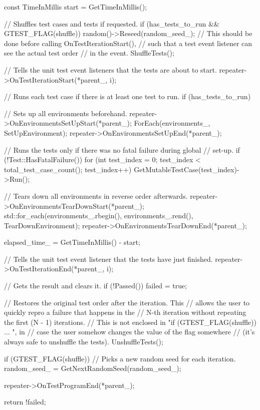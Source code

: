 \begin{DoxyCode}
{{    const TimeInMillis start = GetTimeInMillis();

    // Shuffles test cases and tests if requested.
    if (has_tests_to_run && GTEST_FLAG(shuffle)) {
      random()->Reseed(random_seed_);
      // This should be done before calling OnTestIterationStart(),
      // such that a test event listener can see the actual test order
      // in the event.
      ShuffleTests();
    }

    // Tells the unit test event listeners that the tests are about to start.
    repeater->OnTestIterationStart(*parent_, i);

    // Runs each test case if there is at least one test to run.
    if (has_tests_to_run) {
      // Sets up all environments beforehand.
      repeater->OnEnvironmentsSetUpStart(*parent_);
      ForEach(environments_, SetUpEnvironment);
      repeater->OnEnvironmentsSetUpEnd(*parent_);

      // Runs the tests only if there was no fatal failure during global
      // set-up.
      if (!Test::HasFatalFailure()) {
        for (int test_index = 0; test_index < total_test_case_count();
             test_index++) {
          GetMutableTestCase(test_index)->Run();
        }
      }

      // Tears down all environments in reverse order afterwards.
      repeater->OnEnvironmentsTearDownStart(*parent_);
      std::for_each(environments_.rbegin(), environments_.rend(),
                    TearDownEnvironment);
      repeater->OnEnvironmentsTearDownEnd(*parent_);
    }

    elapsed_time_ = GetTimeInMillis() - start;

    // Tells the unit test event listener that the tests have just finished.
    repeater->OnTestIterationEnd(*parent_, i);

    // Gets the result and clears it.
    if (!Passed()) {
      failed = true;
    }

    // Restores the original test order after the iteration.  This
    // allows the user to quickly repro a failure that happens in the
    // N-th iteration without repeating the first (N - 1) iterations.
    // This is not enclosed in "if (GTEST_FLAG(shuffle)) { ... }", in
    // case the user somehow changes the value of the flag somewhere
    // (it's always safe to unshuffle the tests).
    UnshuffleTests();

    if (GTEST_FLAG(shuffle)) {
      // Picks a new random seed for each iteration.
      random_seed_ = GetNextRandomSeed(random_seed_);
    }
  }

  repeater->OnTestProgramEnd(*parent_);

  return !failed;
}
\end{DoxyCode}
